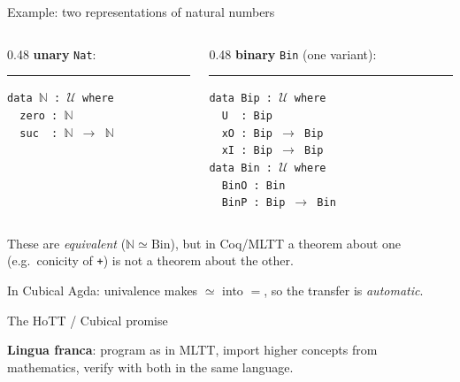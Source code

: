 \documentclass[aspectratio=169,12pt]{beamer}
\begin{document}
\begin{frame}{Example: two representations of natural numbers}
  \begin{columns}[T]
    \begin{column}{0.48\textwidth}
      \textbf{unary} \texttt{Nat}:
      \smallskip
      \hrule
      \smallskip

      \texttt{data $\mathbb{N}$ : $\mathcal{U}$ where}\\
      \texttt{\ \ zero : $\mathbb{N}$}\\
      \texttt{\ \ suc \  : $\mathbb{N}$ $\to$ $\mathbb{N}$}
    \end{column}
    \begin{column}{0.48\textwidth}
      \textbf{binary} \texttt{Bin} (one variant):
      \smallskip
      \hrule
      \smallskip

      \texttt{data Bip : $\mathcal{U}$ where}\\
      \texttt{\ \ U \ : Bip}\\
      \texttt{\ \ xO : Bip $\to$ Bip}\\
      \texttt{\ \ xI : Bip $\to$ Bip}\\[2pt]
      \texttt{data Bin : $\mathcal{U}$ where}\\
      \texttt{\ \ BinO : Bin}\\
      \texttt{\ \ BinP : Bip $\to$ Bin}
    \end{column}
  \end{columns}
  \pause\bigskip
  These are \emph{equivalent} ($\mathbb{N} \simeq \mathrm{Bin}$),
  but in Coq/MLTT a theorem about one (e.g.\ conicity of \texttt{+}) is
  not a theorem about the other.

  \pause\medskip
  In Cubical Agda: univalence makes $\simeq$ into $=$, so the transfer is
  \emph{automatic}.
\end{frame}

\begin{frame}{The HoTT / Cubical promise}
  \begin{center}
  \end{center}
  \pause\medskip
  \textbf{Lingua franca}: program as in MLTT, import higher concepts from mathematics,
  verify with both in the same language.
\end{frame}
\end{document}
